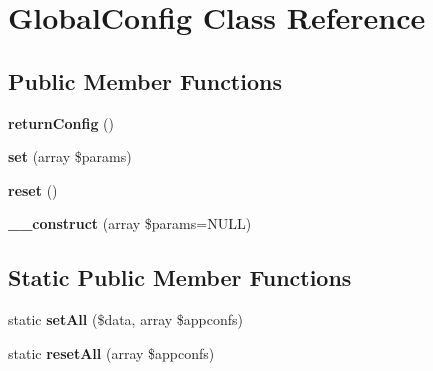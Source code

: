 \hypertarget{class_config_styles_1_1_global_config_1_1_global_config}{
\section{\-Global\-Config \-Class \-Reference}
\label{class_config_styles_1_1_global_config_1_1_global_config}
}
\subsection*{\-Public \-Member \-Functions}
\begin{DoxyCompactItemize}
\item 
\hypertarget{class_config_styles_1_1_global_config_1_1_global_config_af1c51a63a389a43351be05ecc0d1d0e5}{
{\bfseries return\-Config} ()}
\label{class_config_styles_1_1_global_config_1_1_global_config_af1c51a63a389a43351be05ecc0d1d0e5}

\item 
\hypertarget{class_config_styles_1_1_global_config_1_1_global_config_abcc82156be4ee9a19d38b8285b1dfd6a}{
{\bfseries set} (array \$params)}
\label{class_config_styles_1_1_global_config_1_1_global_config_abcc82156be4ee9a19d38b8285b1dfd6a}

\item 
\hypertarget{class_config_styles_1_1_global_config_1_1_global_config_a4a20559544fdf4dcb457e258dc976cf8}{
{\bfseries reset} ()}
\label{class_config_styles_1_1_global_config_1_1_global_config_a4a20559544fdf4dcb457e258dc976cf8}

\item 
\hypertarget{class_config_styles_1_1_global_config_1_1_global_config_a44170d6a9e94a21857d308f91b6188a7}{
{\bfseries \-\_\-\-\_\-construct} (array \$params=\-N\-U\-L\-L)}
\label{class_config_styles_1_1_global_config_1_1_global_config_a44170d6a9e94a21857d308f91b6188a7}

\end{DoxyCompactItemize}
\subsection*{\-Static \-Public \-Member \-Functions}
\begin{DoxyCompactItemize}
\item 
\hypertarget{class_config_styles_1_1_global_config_1_1_global_config_aa2f5106022a1089837b90c6d4fd3539d}{
static {\bfseries set\-All} (\$data, array \$appconfs)}
\label{class_config_styles_1_1_global_config_1_1_global_config_aa2f5106022a1089837b90c6d4fd3539d}

\item 
\hypertarget{class_config_styles_1_1_global_config_1_1_global_config_af8c86634a04005ad12b0bdd5ad870378}{
static {\bfseries reset\-All} (array \$appconfs)}
\label{class_config_styles_1_1_global_config_1_1_global_config_af8c86634a04005ad12b0bdd5ad870378}

\end{DoxyCompactItemize}
